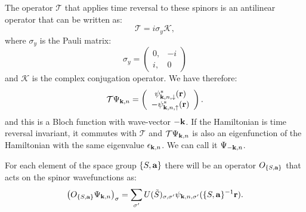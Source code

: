 \documentclass[12pt,a4paper,twoside]{report}
\begin{document}
The operator $\mathcal{T}$ that applies time reversal to these spinors is an antilinear operator that can be written as:
\begin{equation}
\mathcal{T}=i \sigma_y \mathcal{K},
\end{equation}
where $\sigma_y$ is the Pauli matrix:
\begin{equation}
\sigma_y= \left( \begin{array}{cc}
0, & -i  \\
i, & 0  
\end{array}
\right)
\end{equation}
and $\mathcal{K}$ is the complex conjugation operator.
We have therefore:
\begin{equation}
\mathcal{T}\Psi_{{\bf k},n}= \left( \begin{array}{c}
\psi^*_{{\bf k},n,\downarrow}({\bf r})  \\
-\psi^*_{{\bf k},n,\uparrow} ({\bf r})
\end{array}
\right).
\end{equation}
and this is a Bloch function with wave-vector
$-{\bf k}$. If the Hamiltonian is time reversal invariant, it commutes with $\mathcal{T}$ and
$\mathcal{T}\Psi_{{\bf k},n}$ is also an
eigenfunction of the Hamiltonian with the same
eigenvalue $\epsilon_{{\bf k},n}$. We can call
it $\Psi_{-{\bf k},n}$.

For each element of the space group $\{S,{\bf a}\}$ there will be an operator $O_{\{S,{\bf a}\}}$ that acts on the spinor wavefunctions
as:
\begin{equation}
\left(O_{\{S,{\bf a}\}} \Psi_{{\bf k},n}\right)_{\sigma} = \sum_{\sigma'} U(\tilde S)_{\sigma,\sigma'} \psi_{{\bf k},n,\sigma'}(\{S,{\bf a}\}^{-1}{\bf r}). 
\end{equation}
\end{document}
